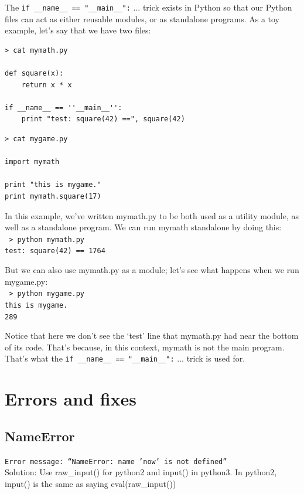 \documentclass[11pt,a4paper]{article}
\begin{document}
The {\tt if \_\_name\_\_ == "\_\_main\_\_":} ... trick exists in Python so that our
Python files can act as either reusable modules, or as standalone
programs. As a toy example, let’s say that we have two files:

\begin{lstlisting}
> cat mymath.py

def square(x):
    return x * x

if __name__ == ''__main__'':
    print "test: square(42) ==", square(42)
\end{lstlisting}

\begin{lstlisting}
> cat mygame.py

import mymath

print "this is mygame."
print mymath.square(17)
\end{lstlisting}

In this example, we’ve written mymath.py to be both used as a utility
module, as well as a standalone program. We can run mymath standalone
by doing this:\\

\noindent
{\tt 
> python mymath.py \\
test: square(42) == 1764 \\
}

But we can also use mymath.py as a module; let’s see what happens when we run mygame.py: \\

\noindent
{\tt 
> python mygame.py \\
this is mygame. \\
289 \\
}

Notice that here we don’t see the ‘test’ line that mymath.py had near
the bottom of its code. That's because, in this context, mymath is not
the main program. That's what the {\tt if \_\_name\_\_ ==
"\_\_main\_\_":} ... trick is used for.





\newpage
\section{Errors and fixes}
    \subsection{NameError}
    {\tt Error message: ``NameError: name 'now' is not defined''}\\
    Solution: Use raw\_input() for python2 and input() in python3. In python2, input() is the same as saying eval(raw\_input()) \\ 
\end{document}

